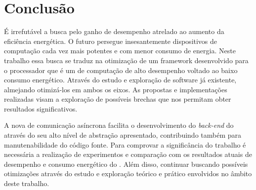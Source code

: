 %

\chapter{Conclusão}
\label{cap:conclusao}


É irrefutável a busca pelo ganho de desempenho atrelado ao aumento da eficiência energética. O futuro persegue insesantemente dispositivos de computação cada vez mais potentes e com menor consumo de energia. Neste trabalho essa busca se traduz na otimização de um framework desenvolvido para o processador \mppa que é um \chip de computação de alto desempenho voltado ao baixo consumo energético. Através do estudo e exploração de software já existente, almejando otimizá-los em ambos os eixos. As propostas e implementações realizadas visam a exploração de possíveis brechas que nos permitam obter resultados significativos.

A nova \api de comunicação asíncrona facilita o desenvolvimento do \textit{back-end} do \fw através do seu alto nível de abstração apresentado, contribuindo também para manutenabilidade do código fonte. Para comprovar a significância do trabalho é necessária a realização de experimentos e comparação com os resultados atuais de desempenho e consumo energético do \pskelmppa. Além disso, continuar buscando possíveis otimizações através do estudo e exploração teórico e prático envolvidos no âmbito deste trabalho.



